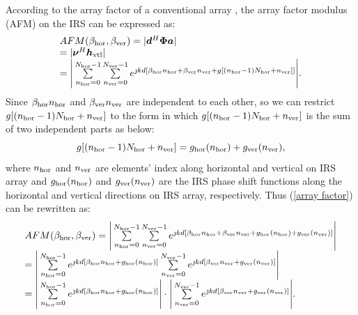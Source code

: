 \documentclass[12pt,draftclsnofoot,onecolumn]{IEEEtran}
\begin{document}
	According to the array factor of a conventional array \cite{DBLP:conf/wcnc/WeiLW17}, the array factor modulus (AFM)  on the IRS can be expressed as:
	\begin{equation}\label{array factor}
		\begin{array}{l}
			AFM(\beta_{\rm hor},\beta_{\rm ver})=|{\bm d}^H{\bm \Phi}{\bm a}|\\
			=|{\bm \nu}^H {\bm h}_{\rm vtl}|\\
			= \Bigg|\sum\limits_{{n_{\rm hor}} = 0}^{N_{\rm hor} - 1} {\sum\limits_{{n_{\rm ver}} = 0}^{N_{\rm ver} - 1} {{e^{{\jmath}kd[{\beta _{\rm hor}}{n_{\rm hor}} + {\beta _{\rm ver}}{n_{\rm ver}} + g[(n_{\rm hor}-1)N_{\rm hor}+n_{\rm ver}]]}}} } \Bigg|.\\
		\end{array}	
	\end{equation}
	Since $\beta_{\rm hor}n_{\rm hor}$ and $\beta_{\rm ver}n_{\rm ver}$ are independent to each other, so we can  restrict $ g[(n_{\rm hor}-1)N_{\rm hor}+n_{\rm ver}]$ to the form in which $g[(n_{\rm hor}-1)N_{\rm hor}+n_{\rm ver}]$ is  the sum of two independent parts as below:
	\begin{equation}\label{guv}
		g[(n_{\rm hor}-1)N_{\rm hor}+n_{\rm ver}]=g_{\rm hor}(n_{\rm hor})+g_{\rm ver}(n_{\rm ver}),	
	\end{equation}
	where  $n_{\rm hor}$ and $n_{\rm ver}$ are elements' index along horizontal and vertical on IRS array  and 
	$g_{\rm hor}(n_{\rm hor})$ and $g_{\rm ver}(n_{\rm ver})$ are the  IRS phase shift functions along the  horizontal  and vertical directions on IRS array, respectively. Thus (\ref{array factor}) can be rewritten as:
	\begin{equation}\label{array factor final}
		\begin{array}{l}
			AFM({\beta _{\rm hor}},{\beta _{\rm ver}}) 
			= \Bigg|\sum\limits_{{n_{\rm hor}} = 0}^{N_{\rm hor} - 1} {\sum\limits_{{n_{\rm ver}} = 0}^{N_{\rm ver} - 1} {{e^{{\jmath}kd[{\beta _{\rm hor}}{n_{\rm hor}} + {\beta _{\rm ver}}{n_{\rm ver}} + {g_{\rm hor}}({n_{\rm hor}}) + {g_{\rm ver}}({n_{\rm ver}})]}}} } \Bigg|\\
			= \Bigg|\sum\limits_{{n_{\rm hor}} = 0}^{N_{\rm hor} - 1} {{e^{{\jmath}kd[{\beta _{\rm hor}}{n_{\rm hor}} + {g_{\rm hor}}({n_{\rm hor}})]}}} \sum\limits_{{n_{\rm ver}} = 0}^{N_{\rm ver} - 1} {{e^{{\jmath}kd[{\beta _{\rm ver}}{n_{\rm ver}} + {g_{\rm ver}}({n_{\rm ver}})]}}} \Bigg|\\
			= \Bigg|\sum\limits_{{n_{\rm hor}} = 0}^{N_{\rm hor} - 1} {{e^{{\jmath}kd[{\beta _{\rm hor}}{n_{\rm hor}} + {g_{\rm hor}}({n_{\rm hor}})]}}} \Bigg|\cdot\Bigg|\sum\limits_{{n_{\rm ver}} = 0}^{N_{\rm ver} - 1} {{e^{{\jmath}kd[{\beta _{\rm ver}}{n_{\rm ver}} + {g_{\rm ver}}({n_{\rm ver}})]}}} \Bigg|.
		\end{array}
	\end{equation}
\end{document}

